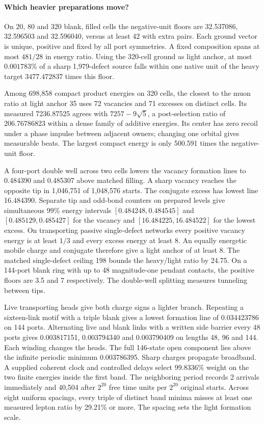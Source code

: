 \paragraph{Which heavier preparations move?}
On 20, 80 and 320 blank, filled cells the negative-unit floors are
32.537086, 32.596503 and 32.596040, versus at least 42 with extra
pairs. Each ground vector is unique, positive and fixed by all port
symmetries. A fixed composition spans at most $481/28$ in energy
ratio. Using the 320-cell ground as light anchor, at most $0.001783\%$
of a sharp 1,979-defect source falls within one native unit of the
heavy target $3477.472837$ times this floor.

Among 698,858 compact product energies on 320 cells, the closest to
the muon ratio at light anchor 35 uses 72 vacancies and 71 excesses
on distinct cells. Its measured 7236.87525 agrees with
$7257-9\sqrt5$, a post-selection ratio of 206.76786823 within a dense
family of additive energies. Its center has zero recoil under a phase impulse
between adjacent owners; changing one orbital gives measurable beats.
The largest compact energy is only 500.591 times the negative-unit floor.

A four-port double well across two cells lowers the vacancy formation
lines to 0.484390 and 0.485307 above matched filling. A sharp vacancy
reaches the opposite tip in 1,046,751 of 1,048,576 starts. The conjugate
excess has lowest line 16.484390. Separate tip and odd-bond counters
on prepared levels give simultaneous 99\% energy intervals
$[0.484248,0.484545]$ and $[0.485129,0.485427]$ for the vacancy
and $[16.484225,16.484522]$ for the lowest excess. On transporting
passive single-defect networks every positive vacancy energy is at
least $1/3$ and every excess energy at least 8. An equally energetic
mobile charge and conjugate therefore give a light anchor of at
least 8. The matched single-defect ceiling 198 bounds the heavy/light
ratio by 24.75. On a 144-port blank ring with up to 48 magnitude-one
pendant contacts, the positive floors are 3.5 and 7 respectively.
The double-well splitting measures tunneling between tips.

Live transporting heads give both charge signs a lighter branch.
Repeating a sixteen-link motif with a triple blank gives a lowest
formation line of 0.034423786 on 144 ports. Alternating live and blank
links with a written side barrier every 48 ports gives 0.003817151,
0.003794340 and 0.003790409 on lengths 48, 96 and 144. Each winding
changes the heads. The full 146-state open component lies above the
infinite periodic minimum 0.003786395. Sharp charges propagate
broadband. A supplied coherent clock and controlled delays select
99.8336\% weight on the two finite energies inside the first band.
The neighboring period records 2 arrivals immediately and 40,504
after $2^{20}$ free time units per $2^{20}$ original starts. Across
eight uniform spacings, every triple of distinct band minima misses
at least one measured lepton ratio by 29.21\% or more. The spacing
sets the light formation scale.

